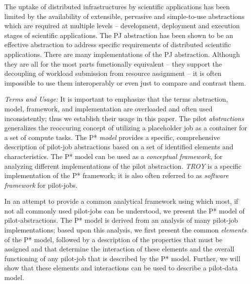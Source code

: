 \documentclass[conference,final]{IEEEtran}
\newcommand{\alnote}[1]{ {\textcolor{blue} { ***andre: #1 }}}
\newcommand{\alnote}[1]{}
\begin{document}



The uptake of distributed infrastructures by scientific applications
has been limited by the availability of extensible, pervasive and
simple-to-use abstractions which are required at multiple levels –
development, deployment and execution stages of scientific
applications. The PJ abstraction has been shown to be an effective
abstraction to address specific requirements of distributed scientific
applications. There are many implementations of the PJ abstraction.
Although they are all for the most parts functionally equivalent --
they support the decoupling of workload submission from resource
assignment -- it is often impossible to use them interoperably or even
just to compare and contrast them.

\emph{Terms and Usage:} It is important to emphasize that the terms
abstraction, model, framework, and implementation are overloaded and
often used inconsistently; thus we establish their usage in this
paper. The pilot \emph{ abstractions} generalizes the reoccuring
concept of utilizing a placeholder job as a container for a set of
compute tasks. %
The P* \emph{model} provides a specific, comprehensive description of
pilot-job abstractions based on a set of identified elements and
characteristics.
The P* model can be used as a {\it conceptual framework}, 
for analyzing different implementations of the pilot
abstraction. \emph{TROY} is a specific implementation of the P*
framework; it is also often referred to as {\it software framework}
for pilot-jobs.

In an attempt to provide a common analytical framework using which
most, if not all commonly used pilot-jobs can be understood, we
present the P* model of pilot-abstractions. The P* model is derived
from an analysis of many pilot-job implementations; based upon this
analysis, we first present the common {\it elements} of the P* model,
followed by a description of the properties that must be assigned and
that determine the interaction of these elements and the overall
functioning of any pilot-job that is described by the P*
model. Further, we will show that these elements and interactions can
be used to describe a pilot-data model.
\end{document}
